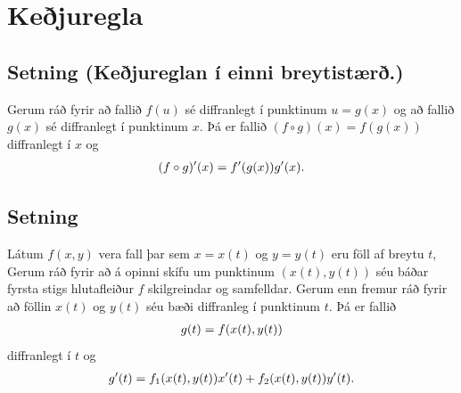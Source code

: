 \documentclass[a4paper,10pt,icelandic]{sphinxmanual}
\begin{document}

\section{Keðjuregla}
\label{Kafli2:index-11}\label{Kafli2:kejuregla}

\subsection{Setning (Keðjureglan í einni breytistærð.)}
\label{Kafli2:index-12}\label{Kafli2:setning-kejureglan-i-einni-breytistaer}
Gerum ráð fyrir að fallið \(f(u)\) sé diffranlegt í punktinum
\(u=g(x)\) og að fallið \(g(x)\) sé diffranlegt í punktinum
\(x\). Þá er fallið \((f\circ g)(x)=f(g(x))\) diffranlegt í
\(x\) og
\begin{gather}
\begin{split}\displaystyle (f\circ g)'(x)=f'(g(x))g'(x).\end{split}\notag
\end{gather}

\subsection{Setning}
\label{Kafli2:id15}
Látum \(f(x,y)\) vera fall þar sem \(x=x(t)\) og \(y=y(t)\)
eru föll af breytu \(t\), Gerum ráð fyrir að á opinni skífu um
punktinum \((x(t),y(t))\) séu báðar fyrsta stigs hlutafleiður
\(f\) skilgreindar og samfelldar. Gerum enn fremur ráð fyrir að
föllin \(x(t)\) og \(y(t)\) séu bæði diffranleg í punktinum
\(t\). Þá er fallið
\begin{gather}
\begin{split}\displaystyle g(t)=f(x(t),y(t))\end{split}\notag
\end{gather}
diffranlegt í \(t\) og
\begin{gather}
\begin{split}\displaystyle g'(t)=f_1(x(t),y(t))x'(t)+f_2(x(t),y(t))y'(t).\end{split}\notag
\end{gather}
\end{document}
